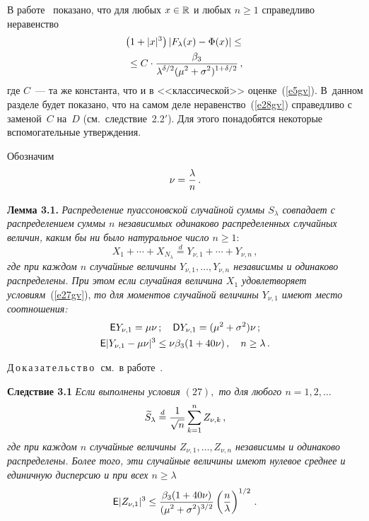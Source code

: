 \begin{multicols}{2}
В работе~\cite{Mich93} показано, что для любых $x\in\mathbb R$
и любых $n\ge1$ справедливо неравенство
\begin{multline}
\left(1+|x|^{3}\right)\left|F_{\lambda}(x)-\Phi(x)\right|\le{}\\
{}\le
C\cdot\displaystyle\frac{\displaystyle \beta_{3}\mathstrut}{\displaystyle \lambda^{\delta/2}(\mu^2+\sigma^2)^{1+\delta/2}\mathstrut}\,,\label{e28gv}
\end{multline}
где $C$~--- та же константа, что и в <<классической>> оценке~(\ref{e5gv}). 
В~данном разделе будет показано, что на самом деле неравенство~(\ref{e28gv})
справедливо с заменой~$C$ на~$D$ (см.\ следствие~2.2$'$). Для этого
понадобятся некоторые вспомогательные утверждения.

Обозначим
$$
\nu = \displaystyle\frac{\displaystyle \lambda\mathstrut}{\displaystyle n\mathstrut}\,.
$$

\medskip

\noindent
\textbf{Лемма 3.1.} \textit{Распределение пуассоновской случайной суммы
$S_\lambda$ совпадает с распределением суммы $n$ независимых
одинаково распределенных случайных величин, каким бы ни было
натуральное число $n\geq1:$}
$$
X_1+\cdots+X_{N_\lambda} \stackrel{d}{=} Y_{\nu,1}+\cdots+Y_{\nu,n}\,,
$$
\textit{где при каждом $n$ случайные величины $Y_{\nu,1},\ldots,
Y_{\nu,n}$ независимы и одинаково распределены. При этом если
случайная величина $X_1$ удовлетворяет условиям}~(\ref{e27gv}), \textit{то для
моментов случайной величины $Y_{\nu,1}$ имеют мес\-то соотношения:}
\begin{gather*}
{\sf E}Y_{\nu,1} = \mu\nu\,; \quad {\sf D}Y_{\nu,1} =
(\mu^2+\sigma^2)\nu\,;\\
{\sf E}|Y_{\nu,1} - \mu\nu|^{3}\leq \nu\beta_{3}(1+40\nu) \,, \quad
n\geq\lambda\,.
\end{gather*}

\medskip

Д\,о\,к\,а\,з\,а\,т\,е\,л\,ь\,с\,т\,в\,о\,\ см.\ в работе~\cite{Shev2007}.

\medskip

\noindent
\textbf{Следствие 3.1} \textit{Если выполнены условия $(27),$ то для
любого $n=1,2, \ldots$}
$$
\widetilde{S}_\lambda \stackrel{d}{=}
\displaystyle\frac{\displaystyle 1\mathstrut}{\displaystyle \sqrt{n}\mathstrut}\sum_{k=1}^n Z_{\nu,k}\,,
$$
\textit{где при каждом $n$ случайные величины $Z_{\nu,1},\ldots,
Z_{\nu,n}$ независимы и одинаково распределены. Более того, эти
случайные величины имеют нулевое среднее и единичную дисперсию и
при всех $n\geq\lambda$}
\begin{equation}
{\sf E}|Z_{\nu,1}|^{3}\le
\displaystyle\frac{\displaystyle \beta_{3}(1+40\nu)\mathstrut}{\displaystyle (\mu^2+\sigma^2)^{3/2}\mathstrut}\left(\displaystyle\frac{\displaystyle n\mathstrut}{\displaystyle \lambda\mathstrut}\right)^{1/2}\,.
\label{e29gv}
\end{equation}


\end{multicols}
